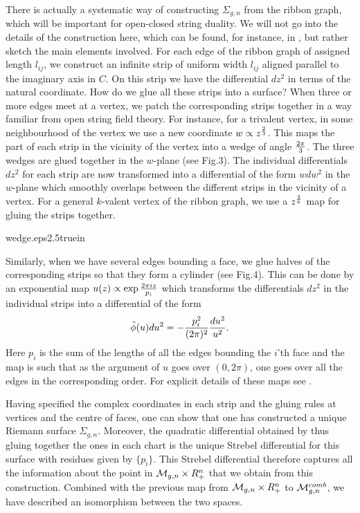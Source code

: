 There is actually a systematic way of constructing $\Sigma_{g,n}$ from
the ribbon graph, which will be  
important for open-closed 
string duality. 
We will not go into the details of the construction here,
which can be found, for instance, in \mp , but rather sketch the main 
elements involved.
For each edge of the ribbon graph of assigned 
length $l_{ij}$, we construct 
an infinite strip of uniform 
width $l_{ij}$ aligned parallel to the imaginary axis in $C$. 
On this strip we 
have the differential $dz^2$ in terms of the natural coordinate.
How do we glue all these strips into a surface? 
When three or more edges meet at a vertex, we patch the corresponding 
strips together  
in a way familiar from open string field theory. For instance, for a 
trivalent vertex, in some neighbourhood of the vertex we use a new 
coordinate $w\propto z^{2\over 3}$. This maps the part of each strip in the
vicinity of the 
vertex into a wedge of angle ${2\pi \over 3}$. The three wedges 
are glued together in the $w$-plane (see Fig.3). 
The individual differentials $dz^2$
for each strip are now transformed into a differential of the form 
$wdw^2$ in the $w$-plane which smoothly overlaps between 
the different strips in the vicinity of a vertex. 
For a general $k$-valent vertex of the ribbon graph, 
we use a $z^{2\over k}$ map for gluing
the strips together.

%
{wedge.eps}{2.5truein}
%

Similarly, when we have several edges bounding a face, we glue 
halves of the corresponding strips so that they form a cylinder (see Fig.4).  
This can be done  
by an exponential map $u(z)\propto \exp{{2\pi iz\over p_i}}$
which transforms the differentials $dz^2$ in the individual strips 
into a differential of the form 
$$\tilde{\phi}(u)du^2=-{p_i^2\over (2\pi)^2}{du^2\over u^2}.$$
Here $p_i$ is the sum of the lengths of all the
edges bounding the $i$'th face and 
the map is such that as the argument of $u$ goes over $(0,2\pi)$, one goes
over all the edges in the corresponding order. For explicit details of these
maps see \mp . 

Having specified the complex coordinates in each strip and the 
gluing rules at vertices and the centre of faces, one can show that
one has constructed a  unique
Riemann surface $\Sigma_{g,n}$. Moreover, the quadratic 
differential obtained by thus
gluing together the ones in each chart is the unique Strebel differential
for this surface with residues given by $\{p_i\}$. This Strebel 
differential therefore captures all the information about the point in
${\cal M}_{g,n}\times R_+^n $ that we obtain from this construction. 
Combined with the previous map from ${\cal M}_{g,n}\times R_+^n$
to ${\cal M}_{g,n}^{comb}$, we have described 
an isomorphism between the two spaces. 

